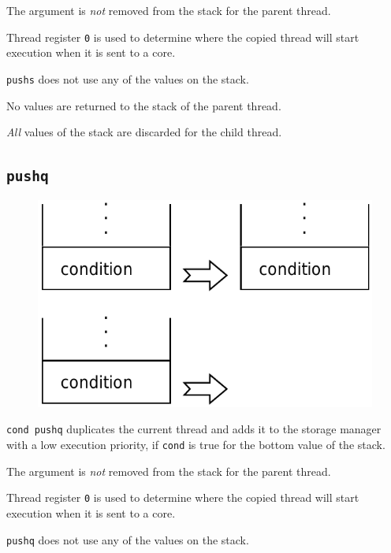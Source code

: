 			The argument is \emph{not} removed from the stack for the parent 
			thread.

			Thread register \texttt{0} is used to determine where the copied
			thread will start execution when it is sent to a core.

			\texttt{pushs} does not use any of the values on the stack.
			
			No values are returned to the stack of the parent thread.

			\emph{All} values of the stack are discarded for the child thread.
	
	\qquad

	\subsection*{\texttt{pushq}}
	
		\begin{figure}
			\begin{flushright}
				\includegraphics[width=\linewidth]{figure/pdf/i_push} 
			\end{flushright}
		\end{figure}
	
			\texttt{cond pushq} duplicates the current thread and adds it to the
			storage manager with a low execution priority, if \texttt{cond} is
			true for the bottom value of the stack.

			The argument is \emph{not} removed from the stack for the parent 
			thread.

			Thread register \texttt{0} is used to determine where the copied
			thread will start execution when it is sent to a core.

			\texttt{pushq} does not use any of the values on the stack.
			
